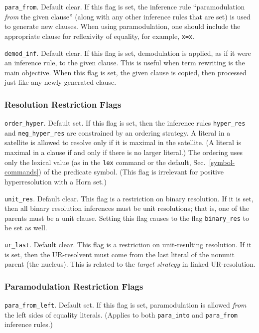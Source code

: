 \documentclass[11pt]{article}
\begin{document}
\noindent
\verb:para_from:.  Default clear.  If this flag is set,
the inference rule ``paramodulation {\it from} the given clause''
(along with any other inference rules that are set) is used to
generate new clauses.  When using paramodulation, one should include
the appropriate clause for reflexivity of equality, for example, \verb:x=x:.

\noindent
\verb:demod_inf:.  Default clear.
If this flag is set, demodulation is applied, as if it were an inference
rule, to the given clause.  This is useful when term rewriting
is the main objective.  When this flag is set, the given clause is copied,
then processed just like any newly generated clause.

\subsubsection{Resolution Restriction Flags} \label{res-flags}

\noindent
\verb:order_hyper:.  Default set.  If this flag is set, then
the inference rules \verb:hyper_res: and \verb:neg_hyper_res: are
constrained by an ordering strategy.  A literal in a satellite is
allowed to resolve only if it is maximal in the satellite.  (A literal
is maximal in a clause if and only if there is no larger literal.)
The ordering uses only the lexical value (as in the \verb:lex: command
or the default, Sec.~\ref{symbol-commands}) of the predicate symbol.
(This flag is irrelevant for positive hyperresolution with a Horn set.)

\noindent
\verb:unit_res:.  Default clear.  
This flag is a restriction on binary resolution.
If it is set, then all binary resolution inferences must
be unit resolutions; that is, one of the parents must be a
unit clause.  Setting this flag causes to the flag
\verb:binary_res: to be set as well.

\noindent
\verb:ur_last:.  Default clear.
This flag is a restriction on unit-resulting resolution.
If it is set, then the UR-resolvent must come from
the last literal of the nonunit parent (the nucleus).
This is related to the \emph{target strategy} in
linked UR-resolution.

\subsubsection{Paramodulation Restriction Flags} \label{para-flags}

\verb:para_from_left:.  Default set.  If this flag is set,
paramodulation is allowed {\it from} the left sides of equality literals.
(Applies to both \verb:para_into: and \verb:para_from: inference rules.)
\end{document}
